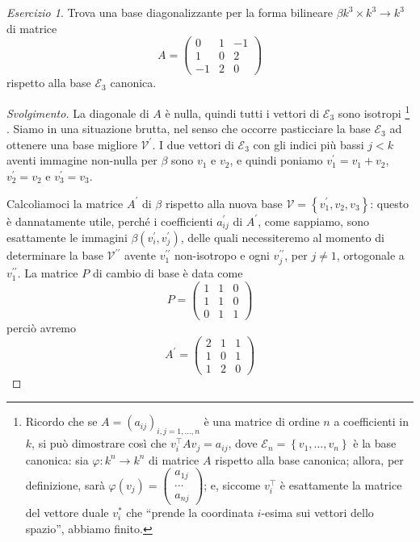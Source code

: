 \documentclass[a4paper]{amsproc}
\theoremstyle{plain}
\theoremstyle{definition}
\theoremstyle{remark}
\newtheorem{esercizio}{Esercizio}[section]
\newcommand{\pt}[1]{\left(\begin{smallmatrix}#1\end{smallmatrix}\right)}
\renewcommand{\phi}{\varphi}
\begin{document}
\begin{esercizio}
  Trova una base diagonalizzante per la forma bilineare $ \beta k^3\times k^3\to k^3 $ di matrice
  \[
    A =%
    \left(%
      \begin{smallmatrix}
        0 & 1 & -1\\
        1 & 0 & 2\\
        -1 & 2 & 0
      \end{smallmatrix}
    \right)
  \]
  rispetto alla base $ \mathcal E_3 $ canonica.
\end{esercizio}
\begin{proof}[Svolgimento]
  La diagonale di $ A $ è nulla, quindi tutti i vettori di $ \mathcal E_3 $ sono isotropi \footnote{%
    Ricordo che se $ A = \left(a_{ij}\right)_{i,j = 1,\dots,n} $ è una matrice di ordine $ n $ a coefficienti in $ k $, si può dimostrare così che $ v_i^\intercal A v_j = a_{ij} $, dove $ \mathcal E_n = \left\{v_1,\dots,v_n\right\} $ è la base canonica: sia $ \phi\colon k^n\to k^n $ di matrice $ A $ rispetto alla base canonica; allora, per definizione, sarà $ \phi(v_j) = \pt{a_{1j}\\\cdots\\a_{nj}} $; e, siccome $ v_i^\intercal $ è esattamente la matrice del vettore duale $ v_i^* $ che ``prende la coordinata $ i $-esima sui vettori dello spazio'', abbiamo finito.}%
  . Siamo in una situazione brutta, nel senso che occorre pasticciare la base $ \mathcal E_3 $ ad ottenere una base migliore $ \mathcal V^\prime $. I due vettori di $ \mathcal E_3 $ con gli indici più bassi $ j<k $ aventi immagine non-nulla per $ \beta $ sono $ v_1 $ e $ v_2 $, e quindi poniamo $ v_1^\prime = v_1 + v_2 $, $ v_2^\prime = v_2 $ e $ v_3^\prime = v_3 $.

  Calcoliamoci la matrice $ A^\prime $ di $ \beta $ rispetto alla nuova base $ \mathcal V = \left\{v_1^\prime,v_2,v_3\right\} $: questo è dannatamente utile, perché i coefficienti $ a_{ij}^\prime $ di $ A^\prime $, come sappiamo, sono esattamente le immagini $ \beta(v_i^\prime,v_j^\prime) $, delle quali necessiteremo al momento di determinare la base $ \mathcal V^{\prime\prime} $ avente $ v_1^{\prime\prime} $ non-isotropo e ogni $ v_j^{\prime\prime} $, per $ j\neq 1 $, ortogonale a $ v_1^{\prime\prime} $. La matrice $ P $ di cambio di base è data come
    \[
    P =%
    \left(%
      \begin{smallmatrix}
        1 & 1 & 0\\
        1 & 1 & 0\\
        0 & 1 & 1
      \end{smallmatrix}
    \right)
  \] perciò avremo
  \[
    A^\prime =%
    \left(%
      \begin{smallmatrix}
        2 & 1 & 1\\
        1 & 0 & 1\\
        1 & 2 & 0
      \end{smallmatrix}
    \right)
  \]


\end{proof}
\end{document}
